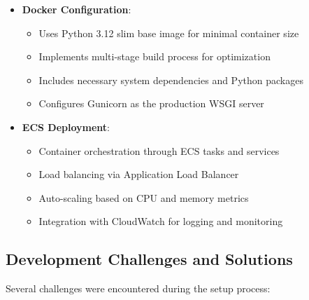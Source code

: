 \documentclass[12pt]{article}
\begin{document}
\begin{itemize}
    \item \textbf{Docker Configuration}:
    \begin{itemize}
        \item Uses Python 3.12 slim base image for minimal container size
        \item Implements multi-stage build process for optimization
        \item Includes necessary system dependencies and Python packages
        \item Configures Gunicorn as the production WSGI server
    \end{itemize}

    \item \textbf{ECS Deployment}:
    \begin{itemize}
        \item Container orchestration through ECS tasks and services
        \item Load balancing via Application Load Balancer
        \item Auto-scaling based on CPU and memory metrics
        \item Integration with CloudWatch for logging and monitoring
    \end{itemize}
\end{itemize}

\subsection{Development Challenges and Solutions}
Several challenges were encountered during the setup process:
\end{document}
